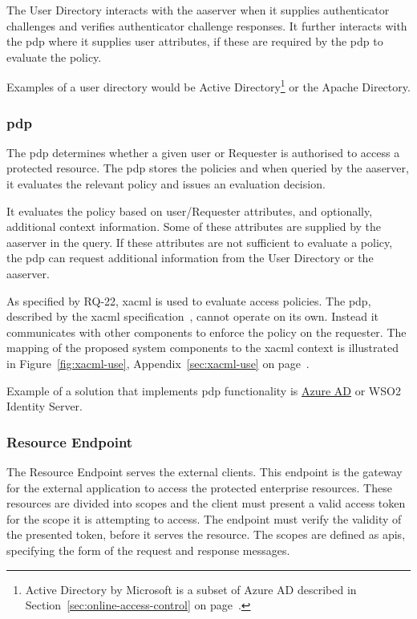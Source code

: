 The User Directory interacts with the \acrshort{aaserver} when it supplies authenticator challenges and verifies authenticator challenge responses. It further interacts with the \acrshort{pdp} where it supplies user attributes, if these are required by the \acrshort{pdp} to evaluate the policy.

Examples of a user directory would be Active Directory\footnote{Active Directory by Microsoft is a subset of Azure AD described in Section~\ref{sec:online-access-control} on page~\pageref{sec:online-access-control}.} or the Apache Directory\footnotemark.
% 
    
\subsubsection{\acrlong{pdp}}
The \acrfull{pdp} determines whether a given user or Requester is authorised to access a protected resource. The \acrshort{pdp} stores the policies and when queried by the \acrshort{aaserver}, it evaluates the relevant policy and issues an evaluation decision.

It evaluates the policy based on user/Requester attributes, and optionally, additional context information. Some of these attributes are supplied by the \acrshort{aaserver} in the query. If these attributes are not sufficient to evaluate a policy, the \acrshort{pdp} can request additional information from the User Directory or the \acrshort{aaserver}.

As specified by RQ-22, \acrshort{xacml} is used to evaluate access policies. The \acrshort{pdp}, described by the \acrshort{xacml} specification~\cite{OASISStandard2013EXtensible3.0}, cannot operate on its own. Instead it communicates with other components to enforce the policy on the requester. The mapping of the proposed system components to the \acrshort{xacml} context is illustrated in Figure~\ref{fig:xacml-use}, Appendix~\ref{sec:xacml-use} on page~\pageref{fig:xacml-use}.

Example of a solution that implements \acrshort{pdp} functionality is \href{sec:online-access-control}{Azure AD} or WSO2 Identity Server\footnotemark.
% 
    
\subsubsection{Resource Endpoint}
The Resource Endpoint serves the external clients. This endpoint is the gateway for the external application to access the protected enterprise resources. These resources are divided into scopes and the client must present a valid access token for the scope it is attempting to access. The endpoint must verify the validity of the presented token, before it serves the resource. The scopes are defined as \acrshort{api}s, specifying the form of the request and response messages.
    
